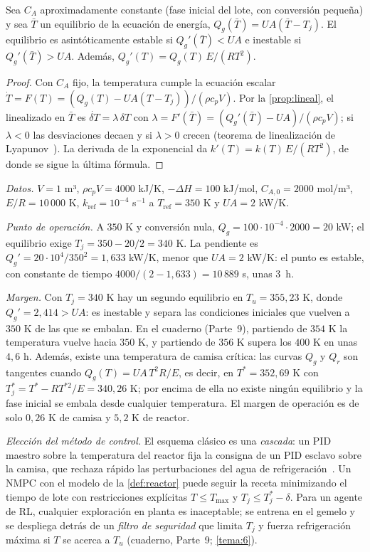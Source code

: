 \begin{proposicion}\label{prop:semenov}
Sea $C_A$ aproximadamente constante (fase inicial del lote, con conversión pequeña) y sea $\bar T$ un equilibrio de la ecuación de energía, $Q_g(\bar T)=UA(\bar T-T_j)$. El equilibrio es asintóticamente estable si $Q_g'(\bar T)<UA$ e inestable si $Q_g'(\bar T)>UA$. Además, $Q_g'(T)=Q_g(T)\,E/(RT^{2})$.
\end{proposicion}

\begin{proof}
Con $C_A$ fijo, la temperatura cumple la ecuación escalar $\dot T=F(T)=(Q_g(T)-UA(T-T_j))/(\rho c_pV)$. Por la \cref{prop:lineal}, el linealizado en $\bar T$ es $\dot{\delta T}=\lambda\,\delta T$ con $\lambda=F'(\bar T)=(Q_g'(\bar T)-UA)/(\rho c_pV)$; si $\lambda<0$ las desviaciones decaen y si $\lambda>0$ crecen (teorema de linealización de Lyapunov~\cite[cap.~5]{am}). La derivada de la exponencial da $k'(T)=k(T)\,E/(RT^{2})$, de donde se sigue la última fórmula.
\end{proof}

\begin{ejemplo}\label{ej:caso-reactor}
\emph{Datos.} $V=1$ m³, $\rho c_pV=4000$ kJ/K, $-\Delta H=100$ kJ/mol, $C_{A,0}=2000$ mol/m³, $E/R=10\,000$ K, $k_{\mathrm{ref}}=10^{-4}$ s$^{-1}$ a $T_{\mathrm{ref}}=350$ K y $UA=2$ kW/K.

\emph{Punto de operación.} A $350$ K y conversión nula, $Q_g=100\cdot10^{-4}\cdot2000=20$ kW; el equilibrio exige $T_j=350-20/2=340$ K. La pendiente es $Q_g'=20\cdot10^{4}/350^{2}=1{,}633$ kW/K, menor que $UA=2$ kW/K: el punto es estable, con constante de tiempo $4000/(2-1{,}633)=10\,889$ s, unas 3~h.

\emph{Margen.} Con $T_j=340$ K hay un segundo equilibrio en $T_u=355{,}23$ K, donde $Q_g'=2{,}414>UA$: es inestable y separa las condiciones iniciales que vuelven a $350$ K de las que se embalan. En el cuaderno (Parte~9), partiendo de $354$ K la temperatura vuelve hacia $350$ K, y partiendo de $356$ K supera los $400$ K en unas $4{,}6$ h. Además, existe una temperatura de camisa crítica: las curvas $Q_g$ y $Q_r$ son tangentes cuando $Q_g(T)=UA\,T^{2}R/E$, es decir, en $T^{*}=352{,}69$ K con $T_j^{*}=T^{*}-RT^{*2}/E=340{,}26$ K; por encima de ella no existe ningún equilibrio y la fase inicial se embala desde cualquier temperatura. El margen de operación es de solo $0{,}26$ K de camisa y $5{,}2$ K de reactor.

\emph{Elección del método de control.} El esquema clásico es una \emph{cascada}: un PID maestro sobre la temperatura del reactor fija la consigna de un PID esclavo sobre la camisa, que rechaza rápido las perturbaciones del agua de refrigeración~\cite{mit10450,seborg}. Un NMPC con el modelo de la \cref{def:reactor} puede seguir la receta minimizando el tiempo de lote con restricciones explícitas $T\le T_{\max}$ y $T_j\le T_j^{*}-\delta$. Para un agente de RL, cualquier exploración en planta es inaceptable; se entrena en el gemelo y se despliega detrás de un \emph{filtro de seguridad} que limita $T_j$ y fuerza refrigeración máxima si $T$ se acerca a $T_u$ (cuaderno, Parte~9; \cref{tema:6}).
\end{ejemplo}

